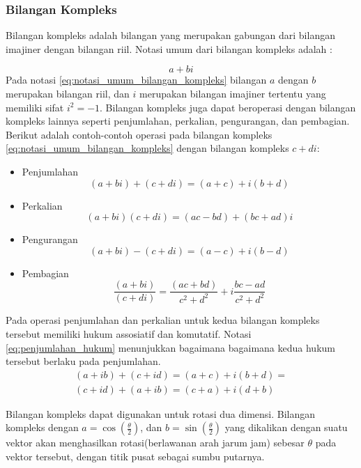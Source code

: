 \subsubsection{Bilangan Kompleks}
\label{sssec:bilangan_kompleks}
\cite{kuipers:1999}
Bilangan kompleks adalah bilangan yang merupakan gabungan dari bilangan imajiner dengan bilangan riil. Notasi umum dari bilangan kompleks adalah :

\begin{equation}
	a+bi
\label{eq:notasi_umum_bilangan_kompleks}
\end{equation}
Pada notasi \ref{eq:notasi_umum_bilangan_kompleks} bilangan \(a\) dengan \(b\) merupakan bilangan riil, dan \(i\) merupakan bilangan imajiner tertentu yang memiliki sifat \(i^2=-1\). Bilangan kompleks juga dapat beroperasi dengan bilangan kompleks lainnya seperti penjumlahan, perkalian, pengurangan, dan pembagian. Berikut adalah contoh-contoh operasi pada bilangan kompleks \ref{eq:notasi_umum_bilangan_kompleks} dengan bilangan kompleks \(c+di\):
\begin{itemize}
	\item Penjumlahan\\
	\[
	 (a + bi) + (c + di) = (a+c) + i(b+d)
	\]
	\item Perkalian\\
	\[
	 (a + bi)(c + di) = (ac−bd) + (bc+ad)i
	\]
	\item Pengurangan\\
	\[
	 (a + bi) - (c + di) = (a-c) + i(b-d)
	\]
	\item Pembagian\\
	\[
	 \frac{(a + bi)}{(c + di)} = \frac{(ac+bd)}{c^2+d^2} + i \frac{bc-ad}{c^2+d^2}
	\]
\end{itemize}
Pada operasi penjumlahan dan perkalian untuk kedua bilangan kompleks tersebut memiliki hukum assosiatif dan komutatif. Notasi \ref{eq:penjumlahan_hukum} menunjukkan bagaimana bagaimana kedua hukum tersebut berlaku pada penjumlahan.
\begin{equation}
	\begin{split}
	(a+ib) + (c+id) = (a+c) + i(b+d)=\\
	(c+id) + (a+ib) = (c+a) + i(d+b)
	\end{split}
\label{eq:penjumlahan_hukum}
\end{equation}

Bilangan kompleks dapat digunakan untuk rotasi dua dimensi. Bilangan kompleks dengan \(a = \cos (\frac{\theta}{2})\), dan \(b = \sin(\frac{\theta}{2})\) yang dikalikan dengan suatu vektor akan menghasilkan rotasi(berlawanan arah jarum jam) sebesar \(\theta\)  pada vektor tersebut, dengan titik pusat sebagai sumbu putarnya.


